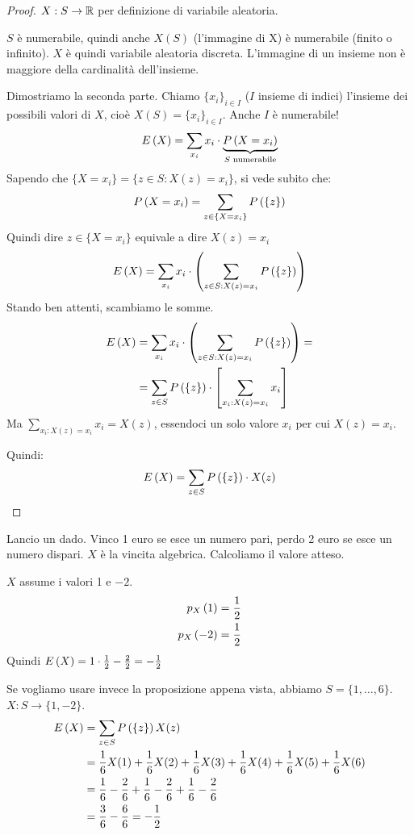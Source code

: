 \begin{proof}
$X : S \to \mathbb{R}$ per definizione di variabile aleatoria.

$S$ \`e numerabile, quindi anche $X(S)$ (l'immagine di X) \`e numerabile (finito o infinito). $X$ \`e quindi variabile aleatoria discreta. L'immagine di un insieme non \`e maggiore della cardinalit\`a dell'insieme.

Dimostriamo la seconda parte. Chiamo $\{x_i\}_{i \in I}$ ($I$ insieme di indici) l'insieme dei possibili valori di $X$, cio\`e $X(S) = \{x_i\}_{i \in I}$. Anche $I$ \`e numerabile!
\[
E \left( X \right) = \sum_{x_i} x_i \cdot \underbrace{P \left( {X = x_i} \right)}_{S \text{ numerabile}}
\]
Sapendo che $\{ X = x_i\} = \{z \in S : X(z) = x_i\}$, si vede subito che:
\[
P \left( {X = x_i} \right) = \sum_{z \in \{X = x_i\}} P \left( {\{z\}} \right)
\]
Quindi dire $z \in \{ X = x_i\}$ equivale a dire $X(z) = x_i$
\[
E \left( X \right) = \sum_{x_i} x_i \cdot \left( \sum_{z \in S : X(z) = x_i} P \left( {\{z\}} \right) \right)
\]
Stando ben attenti, scambiamo le somme.
\begin{align*}
E \left( X \right) &= \sum_{x_i} x_i \cdot \left( \sum_{z \in S : X(z) = x_i} P \left( {\{z\}} \right) \right) = \\
&= \sum_{z \in S} P \left( {\{z\}} \right) \cdot \left[ \sum_{x_i : X(z) = x_i} x_i \right]
\end{align*}
Ma $\sum_{x_i : X(z) = x_i} x_i = X(z)$, essendoci un solo valore $x_i$ per cui $X(z) = x_i$.

Quindi:
\[
E \left( X \right) = \sum_{z \in S} P \left( {\{z\}} \right) \cdot X(z)
\]
\end{proof}

\begin{exmp}
Lancio un dado. Vinco 1 euro se esce un numero pari, perdo 2 euro se esce un numero dispari. $X$ \`e la vincita algebrica. Calcoliamo il valore atteso.

$X$ assume i valori 1 e $-2$.
\begin{align*}
p_{X} \left( 1 \right) &= \frac{1}{2} \\
p_{X} \left( -2 \right) &= \frac{1}{2}
\end{align*}
Quindi $E \left( X \right) = 1 \cdot \frac{1}{2} - \frac{2}{2} = - \frac{1}{2}$

Se vogliamo usare invece la proposizione appena vista, abbiamo $S = \{1, \ldots, 6\}$. $X : S \to \{1, -2\}$.
\begin{align*}
E \left( X \right) &= \sum_{z \in S} P \left( {\{z\}} \right) X(z) \\
&= \frac{1}{6} X(1) + \frac{1}{6} X(2) + \frac{1}{6} X(3) + \frac{1}{6} X(4) + \frac{1}{6} X(5) + \frac{1}{6} X(6) \\
&= \frac{1}{6} - \frac{2}{6} + \frac{1}{6} - \frac{2}{6} + \frac{1}{6} - \frac{2}{6} \\
&= \frac{3}{6} - \frac{6}{6} = - \frac{1}{2}
\end{align*}
\end{exmp}

